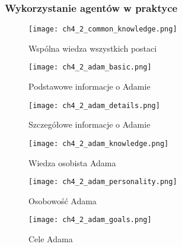 \subsubsection*{Wykorzystanie agentów w praktyce}

\lipsum[1]

\begin{figure}[h!]
    \centering
    \texttt{[image: ch4\_2\_common\_knowledge.png]}
    \caption{Wspólna wiedza wszystkich postaci}
    \label{fig:ch4_2_common_knowledge}
\end{figure}

\lipsum[1]

\begin{figure}[h!]
    \centering
    \texttt{[image: ch4\_2\_adam\_basic.png]}
    \caption{Podstawowe informacje o Adamie}
    \label{fig:ch4_2_adam_basic}
\end{figure}

\lipsum[1]

\begin{figure}[h!]
    \centering
    \texttt{[image: ch4\_2\_adam\_details.png]}
    \caption{Szczegółowe informacje o Adamie}
    \label{fig:ch4_2_adam_details}
\end{figure}

\lipsum[1]

\begin{figure}[h!]
    \centering
    \texttt{[image: ch4\_2\_adam\_knowledge.png]}
    \caption{Wiedza osobista Adama}
    \label{fig:ch4_2_adam_knowledge}
\end{figure}

\lipsum[1]

\begin{figure}[h!]
    \centering
    \texttt{[image: ch4\_2\_adam\_personality.png]}
    \caption{Osobowość Adama}
    \label{fig:ch4_2_adam_personality}
\end{figure}

\lipsum[1]

\begin{figure}[h!]
    \centering
    \texttt{[image: ch4\_2\_adam\_goals.png]}
    \caption{Cele Adama}
    \label{fig:ch4_2_adam_goals}
\end{figure}

\lipsum[1]

